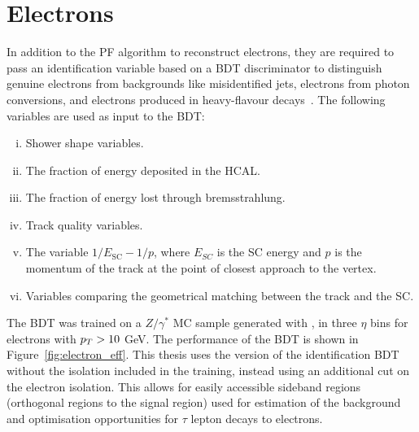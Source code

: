 \section{Electrons}

In addition to the \ac{PF} algorithm to reconstruct electrons, they are required to pass an identification variable based on a \ac{BDT} discriminator to distinguish genuine electrons from backgrounds like misidentified jets, electrons from photon conversions, and electrons produced in heavy-flavour decays~\cite{CMS:2015xaf}.
The following variables are used as input to the \ac{BDT}:

\begin{enumerate}[i)]
\item Shower shape variables.
\item The fraction of energy deposited in the \ac{HCAL}.
\item The fraction of energy lost through bremsstrahlung.
\item Track quality variables.
\item The variable $1/E_{\text{SC}} - 1/p$, where $E_{SC}$ is the \ac{SC} energy and $p$ is the momentum of the track at the point of closest approach to the vertex.
\item Variables comparing the geometrical matching between the track and the \ac{SC}.
\end{enumerate}

The \ac{BDT} was trained on a $Z/\gamma^{*}$ \ac{MC} sample generated with \MADGRAPH, in three $\eta$ bins for electrons with $p_{T}>10$ GeV.
The performance of the \ac{BDT} is shown in Figure~\ref{fig:electron_eff}.
This thesis uses the version of the identification \ac{BDT} without the isolation included in the training, instead using an additional cut on the electron isolation. 
This allows for easily accessible sideband regions (orthogonal regions to the signal region) used for estimation of the background and optimisation opportunities for $\tau$ lepton decays to electrons. \\

